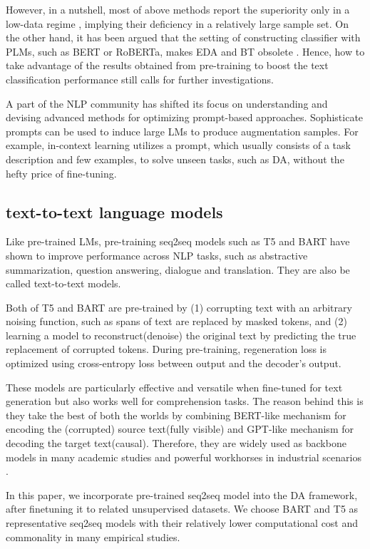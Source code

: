 However, in a nutshell, most of above methods report the superiority only in a low-data regime
\cite{anaby2019not,kumar2020data}, implying their deficiency in a relatively large sample set. 
On the other hand, it has been argued that the setting of constructing classifier with PLMs, such as BERT or RoBERTa, makes EDA and BT obsolete \cite{longpre2020effective}. 
Hence, how to take advantage of the results obtained from pre-training to boost the text classification performance still calls for further investigations. 


A part of the NLP community has shifted its focus on understanding and devising advanced methods for optimizing prompt-based approaches\cite{schick2020exploiting,autoprompt:emnlp20,reynolds2021prompt}. Sophisticate prompts can be used to induce large LMs to produce augmentation samples. For example, in-context learning utilizes a prompt, which usually consists of a task description and few examples, to solve unseen tasks, such as DA, without the hefty price of fine-tuning\cite{yoo2021gpt3mix}. 


\subsection{text-to-text language models}
Like pre-trained LMs, pre-training seq2seq models such as T5 \cite{raffel2019exploring} and BART \cite{lewis2020bart} have shown to improve performance across NLP tasks, such as abstractive summarization, question answering, dialogue and translation. They are also be called text-to-text models. 

Both of T5 and BART are pre-trained by (1) corrupting text with an arbitrary noising function, such as spans of text are replaced by masked tokens, and (2) learning a model to reconstruct(denoise) the original text by predicting the true replacement of corrupted tokens. During pre-training, regeneration loss is optimized using cross-entropy loss between output and the decoder’s output.

These models are particularly effective and versatile when fine-tuned for text generation but also works well for comprehension tasks. The reason behind this is they take the best of both the worlds by combining BERT-like mechanism for encoding the (corrupted) source text(fully visible) and GPT-like mechanism for decoding the target text(causal).
Therefore, they are widely used as backbone models in many academic studies and powerful workhorses in industrial scenarios \cite{liu2020multilingual}. 

In this paper, we incorporate pre-trained seq2seq model into the DA framework, after finetuning it to related unsupervised datasets. We choose BART and T5 as representative seq2seq models with their relatively lower computational cost and commonality in many empirical studies.
